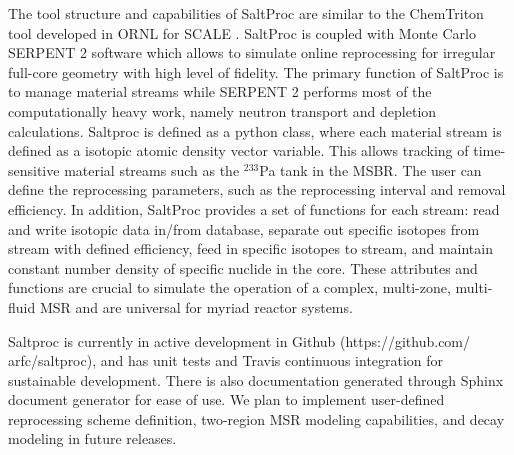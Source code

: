 The tool structure and capabilities of SaltProc are similar to the ChemTriton tool 
developed in \gls{ORNL} for SCALE \cite{powers_new_2013}. SaltProc is coupled with Monte 
Carlo SERPENT 2
software which allows to simulate online reprocessing for irregular full-core 
geometry with high level of fidelity.  The primary function of SaltProc is to 
manage material streams while
SERPENT 2 performs most of the computationally heavy work, namely neutron 
transport and depletion
calculations. Saltproc is defined as a python class, where each material stream 
is defined as a isotopic atomic density
vector variable. This allows tracking of time-sensitive material streams such 
as the
$^{233}$Pa tank in the \gls{MSBR}. The user can define the reprocessing 
parameters, such as the reprocessing interval and removal efficiency.  In 
addition, SaltProc provides a set of functions for each stream: read and write 
isotopic data in/from database, separate out specific isotopes from stream with 
defined efficiency, feed in specific isotopes to stream, and maintain constant 
number density of specific nuclide in the core. These attributes and functions 
are crucial to simulate the operation of a complex, multi-zone, multi-fluid 
\gls{MSR} and are universal for myriad reactor systems.

Saltproc is currently in active development in Github (https://github.com/ 
arfc/saltproc), and has unit tests and Travis continuous integration for 
sustainable development. There is also documentation
generated through Sphinx document generator for ease of use. We plan to 
implement
user-defined reprocessing scheme definition, two-region \gls{MSR} modeling 
capabilities,
and decay modeling in future releases.

